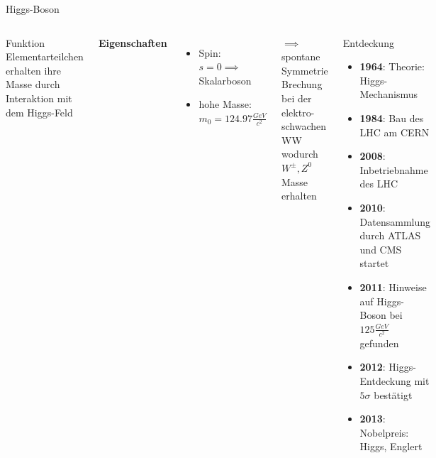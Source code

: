 \documentclass[aspectratio=169,xcolor=dvipsnames]{beamer}
\begin{document}
\begin{frame}{Higgs-Boson}
    \begin{columns}[c]
        \begin{block}{Funktion}
            Elementarteilchen erhalten ihre Masse durch Interaktion mit dem Higgs-Feld
        \end{block}
        \vspace{10pt}
        \textbf{Eigenschaften}
        \begin{itemize}
            \item Spin: $s=0 \implies$ Skalarboson
            \item hohe Masse: $m_0 = 124.97 \frac{GeV}{c^2}$
        \end{itemize}
        \vspace{10pt}
        $\implies$ spontane Symmetrie Brechung bei der elektro-schwachen WW wodurch $W^\pm, Z^0$ Masse erhalten
        \pause
        \begin{exampleblock}{Entdeckung}
            \begin{itemize}
                \item \textbf{1964}: Theorie: Higgs-Mechanismus
                \item \textbf{1984}: Bau des LHC am CERN
                \item \textbf{2008}: Inbetriebnahme des LHC
                \item \textbf{2010}: Datensammlung durch ATLAS und CMS startet
                \item \textbf{2011}: Hinweise auf Higgs-Boson bei $125 \frac{GeV}{c^2}$ gefunden
                \item \textbf{2012}: Higgs-Entdeckung mit $5 \sigma$ bestätigt
                \item \textbf{2013}: Nobelpreis: Higgs, Englert
            \end{itemize}
        \end{exampleblock}
    \end{columns}
\end{frame}
\end{document}
